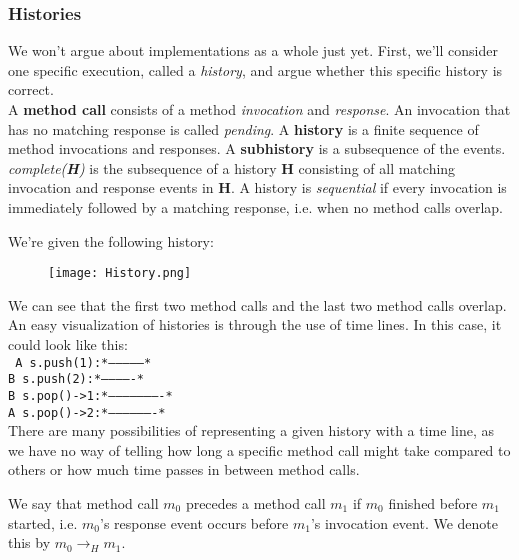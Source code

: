 \documentclass[main]{subfiles}
\begin{document}
\subsubsection{Histories}
We won't argue about implementations as a whole just yet. First, we'll consider one specific execution, called a \textit{history}, and argue whether this specific history is correct.\\[3mm]
A \textbf{method call} consists of a method \textit{invocation} and \textit{response}. An invocation that has no matching response is called \textit{pending}. A \textbf{history} is a finite sequence of method invocations and responses. A \textbf{subhistory} is a subsequence of the events. \textit{complete(\textbf{H})} is the subsequence of a history \textbf{H} consisting of all matching invocation and response events in \textbf{H}. A history is \textit{sequential} if every invocation is immediately followed by a matching response, i.e. when no method calls overlap.\\[3mm]
\begin{example}
    We're given the following history:
    \begin{figure}[H]
        \centering
        \texttt{[image: History.png]}
    \end{figure}
    \noindent We can see that the first two method calls and the last two method calls overlap.\\
    An easy visualization of histories is through the use of time lines. In this case, it could look like this:\\[3mm]
    \texttt{
        A s.push(1):\hspace{6pt}*--------------*\\
        B s.push(2):\hspace{30pt}*-------------*\\
        B s.pop()->1:\hspace{170pt}*----------------------*\\
        A s.pop()->2:\hspace{200pt}*-------------------*\\
    }
    There are many possibilities of representing a given history with a time line, as we have no way of telling how long a specific method call might take compared to others or how much time passes in between method calls.
\end{example}
We say that method call $m_0$ precedes a method call $m_1$ if $m_0$ finished before $m_1$ started, i.e. $m_0$'s response event occurs before $m_1$'s invocation event. We denote this by $m_0 \rightarrow_H m_1$.
\end{document}
